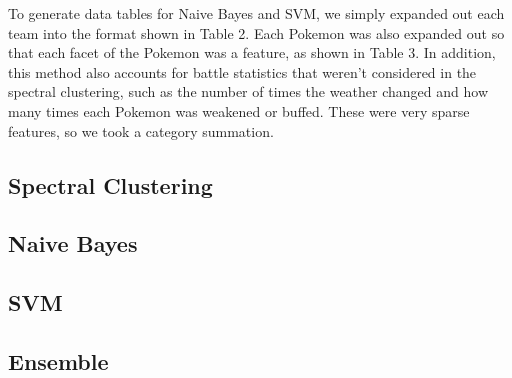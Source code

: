 \documentclass{acm_proc_article-sp}
\begin{document}
To generate data tables for Naive Bayes and SVM, we simply expanded out each team into the format shown in Table 2. Each Pokemon was also expanded out so that each facet of the Pokemon was a feature, as shown in Table 3. In addition, this method also accounts for battle statistics that weren't considered in the spectral clustering, such as the number of times the weather changed and how many times each Pokemon was weakened or buffed. These were very sparse features, so we took a category summation.

\subsection{Spectral Clustering}

\subsection{Naive Bayes}

\subsection{SVM}

\subsection{Ensemble}
\end{document}
